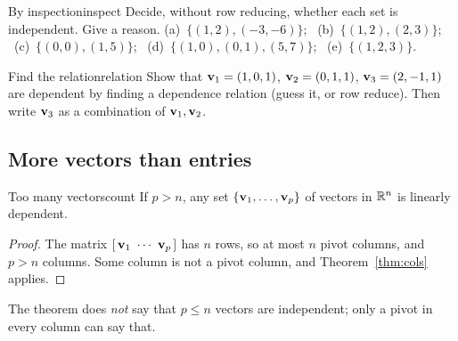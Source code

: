 \documentclass[11pt]{article}
\begin{document}
\begin{kc}{By inspection}{inspect}
Decide, without row reducing, whether each set is independent. Give a reason.
(a)~$\{(1,2),(-3,-6)\}$; \ (b)~$\{(1,2),(2,3)\}$; \ (c)~$\{(0,0),(1,5)\}$; \ (d)~$\{(1,0),(0,1),(5,7)\}$; \ (e)~$\{(1,2,3)\}$.
\end{kc}

\begin{kc}{Find the relation}{relation}
Show that $\mathbf{v}_1=(1,0,1)$, $\mathbf{v}_2=(0,1,1)$, $\mathbf{v}_3=(2,-1,1)$ are dependent by finding a dependence relation (guess it, or row reduce). Then write $\mathbf{v}_3$ as a combination of $\mathbf{v}_1,\mathbf{v}_2$.
\end{kc}

\subsection*{More vectors than entries}

\begin{thm}{Too many vectors}{count}
If $p>n$, any set $\{\mathbf{v}_1,\dots,\mathbf{v}_p\}$ of vectors in $\mathbb{R}^n$ is linearly dependent.
\end{thm}

\begin{proof}
The matrix $[\,\bv{v}_1\ \cdots\ \bv{v}_p\,]$ has $n$ rows, so at most $n$ pivot columns, and $p>n$ columns. Some column is not a pivot column, and Theorem~\ref{thm:cols} applies.
\end{proof}

The theorem does \emph{not} say that $p\le n$ vectors are independent; only a pivot in every column can say that.
\end{document}
